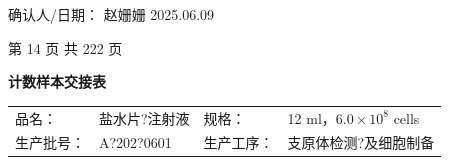 \documentclass[UTF8,10pt,a4paper,fontset=fandol]{ctexart}
\newcommand{\fieldvalue}[1]{#1}
\newcommand{\handwritten}[1]{#1}
\begin{document}
\medskip
\noindent
确认人/日期：
\fieldvalue{\handwritten{赵姗姗}}
\hspace{1cm}
\fieldvalue{\handwritten{2025.06.09}}

\vfill
\begin{center}
第 14 页 共 222 页
\end{center}

\newpage

\begin{center}
\textbf{计数样本交接表}
\end{center}

\noindent
\begin{tabularx}{\textwidth}{lX lX}
品名：&
\fieldvalue{\handwritten{盐水片?注射液}}&
规格：&
\fieldvalue{\handwritten{12 ml，$6.0\times10^{8}$ cells}}\\
生产批号：&
\fieldvalue{\handwritten{A?202?0601}}&
生产工序：&
\fieldvalue{\handwritten{支原体检测?及细胞制备}}\\
\end{tabularx}

\vspace{2mm}
\end{document}
